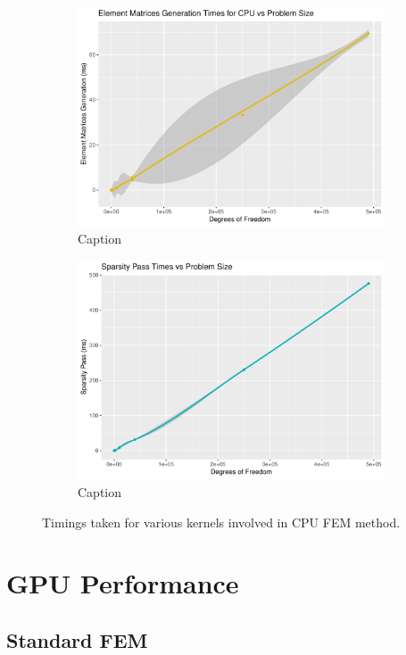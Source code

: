 \begin{figure}
\begin{subfigure}{0.48\linewidth}
		\includegraphics[width=\linewidth]{Plots/elem_mats_cpu}
		\caption{Caption}
		\label{fig:elems_sparse}
	\end{subfigure}\hfill
	\begin{subfigure}{0.48\linewidth}
		\centering
		\includegraphics[width=\linewidth]{Plots/sparsity_pass_cpu}
		\caption{Caption}
		\label{fig:sparsity_scan}
	\end{subfigure}
	\caption{Timings taken for various kernels involved in CPU FEM method.}
	\label{fig:kerns}
\end{figure}
\section{GPU Performance}

\subsection{Standard FEM}

